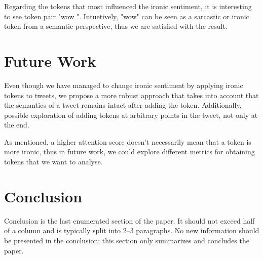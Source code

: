 \documentclass[10pt, a4paper]{article}
\begin{document}
Regarding the tokens that most influenced the ironic sentiment, it is interesting to see token pair "wow \textvisiblespace ".
Intuetively, "wow" can be seen as a sarcastic or ironic token from a semantic perspective, thus we are satisfied with the result.

\section{Future Work}

Even though we have managed to change ironic sentiment by applying ironic tokens to tweets, we propose a more robust approach that takes into account that the semantics of a tweet remains intact after adding the token.
Additionally, possible exploration of adding tokens at arbitrary points in the tweet, not only at the end.

As mentioned, a higher attention score doesn't necessarily mean that a token is more ironic, thus in future work, we could explore different metrics for obtaining tokens that we want to analyse.

\section{Conclusion}

Conclusion is the last enumerated section of the paper. It should not exceed half of a column and is typically split into 2--3 paragraphs. No new information should be presented in the conclusion; this section only summarizes and concludes the paper.


 
\end{document}
